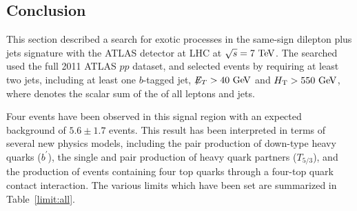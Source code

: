 
\subsection{Conclusion}\label{sect:conclusion}

This section described a search for exotic processes in the same-sign dilepton plus jets signature with the ATLAS detector at LHC at $\sqrt{s}=7 \TeV$.
The searched used the full 2011 ATLAS $pp$ dataset, and selected events by requiring at least two jets, including at least one $b$-tagged jet, $\met>40 \GeV$ and $\HT>550 \GeV$, where \HT{} denotes the scalar sum of the \pT{} of all leptons and jets. 

Four events have been observed in this signal region with an expected background of $5.6\pm1.7$ events. 
This result has been interpreted in terms of several new physics models, including the pair production of down-type heavy quarks ($b^\prime$), the single and pair production of heavy quark partners ($T_{5/3}$), and the production of events containing four top quarks through a four-top quark contact interaction. 
The various limits which have been set are summarized in Table~\ref{limit:all}.


